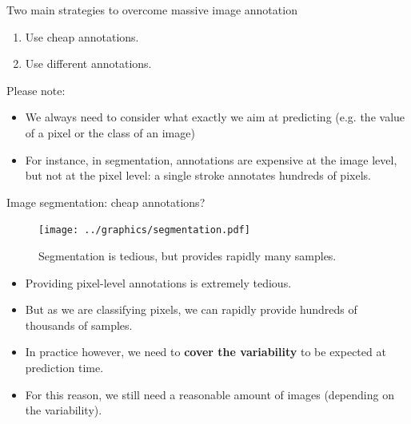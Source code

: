 \documentclass[xcolor=pdftex,dvipsnames,table]{beamer}
\begin{document}
\begin{frame}{Two main strategies to overcome massive image annotation}
\begin{enumerate}
   \item Use cheap annotations. 
   \item Use different annotations. 
\end{enumerate}
\vspace{2cm}
Please note:
\begin{itemize}
   \item We always need to consider what exactly we aim at predicting (e.g. the value of a pixel or the class of an image)
   \item For instance, in segmentation, annotations are expensive at the image level, but not at the pixel level: a single stroke annotates hundreds of pixels. 
\end{itemize}
\end{frame}

\begin{frame}{Image segmentation: cheap annotations?}
\begin{figure}[htb]
   \centering
   \texttt{[image: ../graphics/segmentation.pdf]}
   \caption{Segmentation is tedious, but provides rapidly many samples.}
\end{figure}
\begin{itemize}
   \item Providing pixel-level annotations is extremely tedious.
   \item But as we are classifying pixels, we can rapidly provide hundreds of thousands of samples. 
   \item In practice however, we need to \textbf{cover the variability} to be expected at prediction time. 
   \item For this reason, we still need a reasonable amount of images (depending on the variability). 
\end{itemize}
\end{frame}
\end{document}
